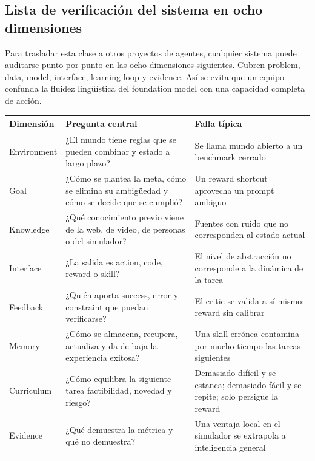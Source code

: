 
\subsection{Lista de verificación del sistema en ocho dimensiones}

Para trasladar esta clase a otros proyectos de agentes, cualquier sistema puede auditarse punto por punto en las ocho dimensiones siguientes. Cubren problem, data, model, interface, learning loop y evidence. Así se evita que un equipo confunda la fluidez lingüística del foundation model con una capacidad completa de acción.

\begin{longtable}{@{}L{0.18\textwidth}L{0.34\textwidth}L{0.36\textwidth}@{}}
\toprule
Dimensión & Pregunta central & Falla típica \\
\midrule
Environment & ¿El mundo tiene reglas que se pueden combinar y estado a largo plazo? & Se llama mundo abierto a un benchmark cerrado \\
Goal & ¿Cómo se plantea la meta, cómo se elimina su ambigüedad y cómo se decide que se cumplió? & Un reward shortcut aprovecha un prompt ambiguo \\
Knowledge & ¿Qué conocimiento previo viene de la web, de video, de personas o del simulador? & Fuentes con ruido que no corresponden al estado actual \\
Interface & ¿La salida es action, code, reward o skill? & El nivel de abstracción no corresponde a la dinámica de la tarea \\
Feedback & ¿Quién aporta success, error y constraint que puedan verificarse? & El critic se valida a sí mismo; reward sin calibrar \\
Memory & ¿Cómo se almacena, recupera, actualiza y da de baja la experiencia exitosa? & Una skill errónea contamina por mucho tiempo las tareas siguientes \\
Curriculum & ¿Cómo equilibra la siguiente tarea factibilidad, novedad y riesgo? & Demasiado difícil y se estanca; demasiado fácil y se repite; solo persigue la reward \\
Evidence & ¿Qué demuestra la métrica y qué no demuestra? & Una ventaja local en el simulador se extrapola a inteligencia general \\
\bottomrule
\end{longtable}

